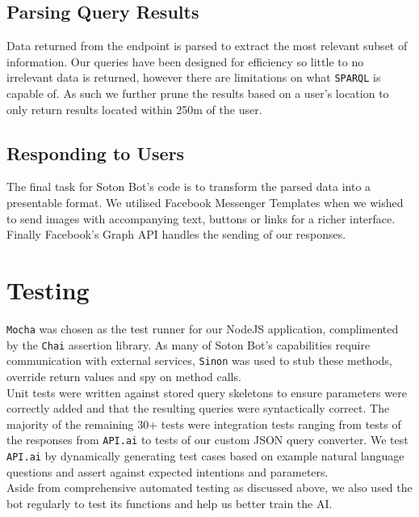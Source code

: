 \documentclass[journal, a4paper]{IEEEtran}
\begin{document}
\subsection{Parsing Query Results}
Data returned from the endpoint is parsed to extract the most relevant subset of information. Our queries have been designed for efficiency so  little to no irrelevant data is returned, however there are limitations on what \texttt{SPARQL} is capable of. As such we further prune the results based on a user's location to only return results located within 250m of the user.\\ 

\subsection{Responding to Users}
The final task for Soton Bot's code is to transform the parsed data into a presentable format. We utilised Facebook Messenger Templates when we wished to send images with accompanying text, buttons or links for a richer interface. Finally Facebook's Graph API handles the sending of our responses.\\ 

\section{Testing}

\texttt{Mocha}\cite{mocha} was chosen as the test runner for our NodeJS application, complimented by the \texttt{Chai}\cite{chai} assertion library. As many of Soton Bot's capabilities require communication with external services, \texttt{Sinon}\cite{sinon} was used to stub these methods, override return values and spy on method calls.\\

Unit tests were written against stored query skeletons to ensure parameters were correctly added and that the resulting queries were syntactically correct. The majority of the remaining 30+ tests were integration tests ranging from tests of the responses from \texttt{API.ai}\cite{api_ai} to tests of our custom JSON query converter. We test \texttt{API.ai} by dynamically generating test cases based on example natural language questions and assert against expected intentions and parameters.\\

Aside from comprehensive automated testing as discussed above, we also used the bot regularly to test its functions and help us better train the AI.
\end{document}
